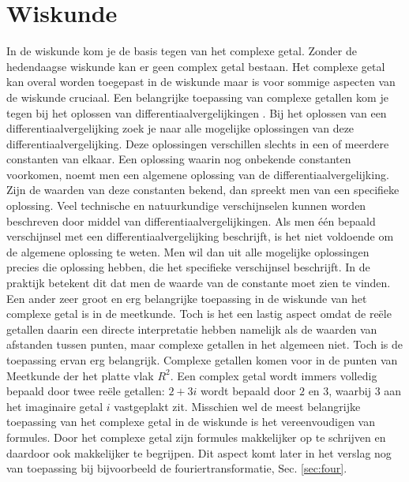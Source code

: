 \documentclass[11pt,fleqn]{book} %
\begin{document}
\section{Wiskunde}
In de wiskunde kom je de basis tegen van het complexe getal. Zonder de hedendaagse wiskunde kan er geen complex getal bestaan. Het complexe getal kan overal worden toegepast in de wiskunde maar is voor sommige aspecten van de wiskunde cruciaal. 
Een belangrijke toepassing van complexe getallen kom je tegen bij het oplossen van differentiaalvergelijkingen \cite{dg}. Bij het oplossen van een differentiaalvergelijking zoek je naar alle mogelijke oplossingen van deze differentiaalvergelijking. Deze oplossingen verschillen slechts in een of meerdere constanten van elkaar. Een oplossing waarin nog onbekende constanten voorkomen, noemt men een algemene oplossing van de differentiaalvergelijking. Zijn de waarden van deze constanten bekend, dan spreekt men van een specifieke oplossing. Veel technische en natuurkundige verschijnselen kunnen worden beschreven door middel van differentiaalvergelijkingen. Als men één bepaald verschijnsel met een differentiaalvergelijking beschrijft, is het niet voldoende om de algemene oplossing te weten. Men wil dan uit alle mogelijke oplossingen precies die oplossing hebben, die het specifieke verschijnsel beschrijft. In de praktijk betekent dit dat men de waarde van de constante moet zien te vinden.
Een ander zeer groot en erg belangrijke toepassing in de wiskunde van het complexe getal is in de meetkunde. Toch is het een lastig aspect omdat de reële getallen daarin een directe interpretatie hebben namelijk als de waarden van afstanden tussen punten, maar complexe getallen in het algemeen niet. Toch is de toepassing ervan erg belangrijk. Complexe getallen komen voor in de punten van Meetkunde der het platte vlak $R^2$. Een complex getal wordt immers volledig bepaald door twee reële getallen: $2 + 3i$ wordt bepaald door $2$ en $3$, waarbij $3$ aan het imaginaire getal $i$ vastgeplakt zit.
Misschien wel de meest belangrijke toepassing van het complexe getal in de wiskunde is het vereenvoudigen van formules. Door het complexe getal zijn formules makkelijker op te schrijven en daardoor ook makkelijker te begrijpen. Dit aspect komt later in het verslag nog van toepassing bij bijvoorbeeld de fouriertransformatie, Sec. \ref{sec:four}.



\end{document}
